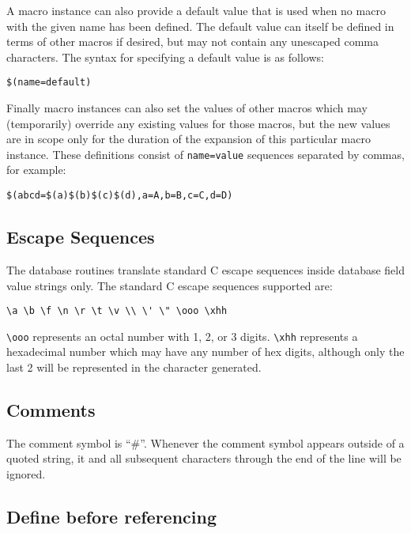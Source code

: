 A macro instance can also provide a default value that is used when no macro with the given name has been defined.
The default value can itself be defined in terms of other macros if desired, but may not contain any unescaped comma characters.
The syntax for specifying a default value is as follows:

\begin{lstlisting}[language=dbd]
$(name=default)
\end{lstlisting}

Finally macro instances can also set the values of other macros which may (temporarily) override any existing values for those macros, but the new values are in scope only for the duration of the expansion of this particular macro instance.
These definitions consist of \verb|name=value| sequences separated by commas, for example:

\begin{lstlisting}[language=dbd]
$(abcd=$(a)$(b)$(c)$(d),a=A,b=B,c=C,d=D)
\end{lstlisting}

\subsection{Escape Sequences}
\label{subsec:Escape Sequences}

The database routines translate standard C escape sequences inside database field value strings only.
The standard C escape sequences supported are:

\begin{lstlisting}[language=dbd]
\a \b \f \n \r \t \v \\ \' \" \ooo \xhh
\end{lstlisting}

\verb|\ooo| represents an octal number with 1, 2, or 3 digits.
\verb|\xhh| represents a hexadecimal number which may have any number of hex digits, although only the last 2 will be represented in the character generated.

\subsection{Comments}

The comment symbol is ``\#''.
Whenever the comment symbol appears outside of a quoted string, it and all subsequent characters through the end of the line will be ignored.

\subsection{Define before referencing}

